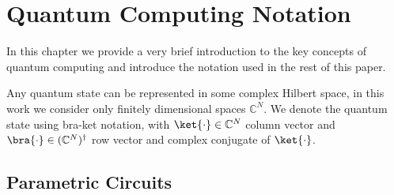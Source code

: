 \chapter{Quantum Computing Notation}\label{chapter:quantum_mechanic_introduction}

In this chapter we provide a very brief introduction to the key concepts of
quantum computing and introduce the notation used in the rest of this paper. 

Any quantum state can be represented in some complex Hilbert space, in this work
we consider only finitely dimensional spaces $\mathbb{C}^N$. We denote the
quantum state using bra-ket notation, with $\ket{\cdot} \in \mathbb{C}^N$ column
vector and $\bra{\cdot} \in (\mathbb{C}^{N})^{\dagger}$ row vector and complex
conjugate of $\ket{\cdot}$.

\section{Parametric Circuits}


